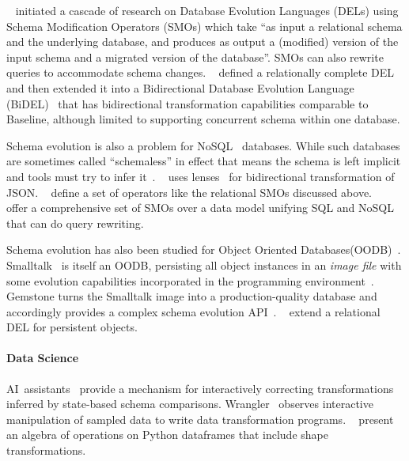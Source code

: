 \documentclass[english,submission]{programming}
\theoremstyle{definition}
\newcommand{\citet}[1]{\citeauthor*{#1}~\cite{#1}}
\newcommand{\myparagraph}[1]{\vspace{-8pt}\paragraph{#1}}
\begin{document}
\citet{curino08} initiated a cascade of research on Database Evolution Languages (DELs) using Schema Modification Operators (SMOs) which take
 ``as input a relational schema and the underlying database, and produces as output a (modified) version of the input schema and a migrated version of the database''. SMOs can also rewrite queries to accommodate schema changes.
 \citet{herrmann15} defined a relationally complete DEL and then extended it into a Bidirectional Database Evolution Language (BiDEL)~\cite{herrmann17} that has bidirectional transformation capabilities comparable to Baseline, although limited to supporting concurrent schema within one database.

Schema evolution is also a problem for NoSQL~\cite{sadalage12} databases. While such databases are sometimes called ``schemaless'' in effect that means the schema is left implicit and tools must try to infer it~\cite{storl20, storl22}. \citet{Cambria} uses lenses~\cite{Foster2007} for bidirectional transformation of JSON. \citet{scherzinger13} define a set of operators like the relational SMOs discussed above. \citeauthor*{chillon22}~\cite{chillon22, chillon23} offer a comprehensive set of SMOs over a data model unifying SQL and NoSQL that can do query rewriting.

Schema evolution has also been studied for Object Oriented Databases(OODB)~\cite{li99, banerjee87}. Smalltalk~\cite{Goldberg80} is itself an OODB, persisting all object instances in an \textit{image file} with some evolution capabilities incorporated in the programming environment~\cite[pp.252-272]{Goldberg80}. Gemstone turns the Smalltalk image into a production-quality database and accordingly provides a complex schema evolution API~\cite{Gemstone}. \citet{kamina25} extend a relational DEL for persistent objects.

\myparagraph{Data Science}
AI~assistants~\cite{AIassistants} provide a mechanism for interactively correcting
transformations inferred by state-based schema comparisons.
Wrangler~\cite{kandel11} observes interactive manipulation of sampled data to write data transformation programs.
\citet{petersohn20} present an algebra of operations on Python dataframes that include shape transformations.
\end{document}
